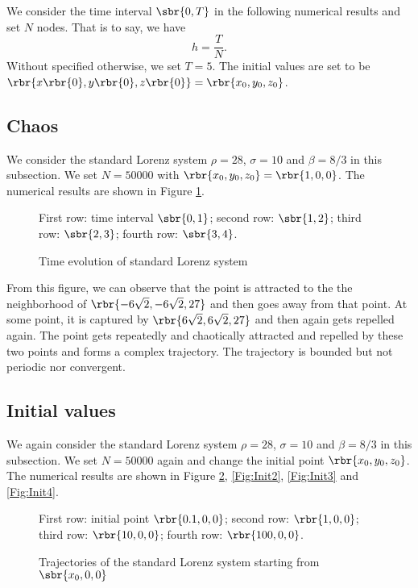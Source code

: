 \documentclass[english, nochinese]{pnote}
\begin{document}
We consider the time interval $ \sbr{ 0, T } $ in the following numerical results and set $N$ nodes. That is to say, we have
\begin{equation}
h = \frac{T}{N}.
\end{equation}
Without specified otherwise, we set $ T = 5 $. The initial values are set to be $ \rbr{ x \rbr{0}, y \rbr{0}, z \rbr{0} } = \rbr{ x_0, y_0, z_0 } $.

\subsection{Chaos}

We consider the standard Lorenz system $ \rho = 28 $, $ \sigma = 10 $ and $ \beta = 8 / 3 $ in this subsection. We set $ N = 50000 $ with $ \rbr{ x_0, y_0, z_0 } = \rbr{ 1, 0, 0 } $. The numerical results are shown in Figure \ref{Fig:Chaos}.

\begin{figure}[htbp]
{
\centering
\scalebox{0.5}{}
\scalebox{0.5}{}
\scalebox{0.5}{}
\scalebox{0.5}{}
\caption{Time evolution of standard Lorenz system}
\label{Fig:Chaos}
}
{
\footnotesize First row: time interval $ \sbr{ 0, 1 } $; second row: $ \sbr{ 1, 2 } $; third row: $ \sbr{ 2, 3 } $; fourth row: $ \sbr{ 3, 4 } $.
}
\end{figure}

From this figure, we can observe that the point is attracted to the the neighborhood of $ \rbr{ -6 \sqrt{2}, -6 \sqrt{2}, 27 } $ and then goes away from that point. At some point, it is captured by $ \rbr{ 6 \sqrt{2}, 6 \sqrt{2}, 27 } $ and then again gets repelled again. The point gets repeatedly and chaotically attracted and repelled by these two points and forms a complex trajectory. The trajectory is bounded but not periodic nor convergent.

\subsection{Initial values}

We again consider the standard Lorenz system $ \rho = 28 $, $ \sigma = 10 $ and $ \beta = 8 / 3 $ in this subsection. We set $ N = 50000 $ again and change the initial point $ \rbr{ x_0, y_0, z_0 } $. The numerical results are shown in Figure \ref{Fig:Init1}, \ref{Fig:Init2}, \ref{Fig:Init3} and \ref{Fig:Init4}.

\begin{figure}[htbp]
{
\centering
\scalebox{0.5}{}
\scalebox{0.5}{}
\scalebox{0.5}{}
\scalebox{0.5}{}
\caption{Trajectories of the standard Lorenz system starting from $ \sbr{ x_0, 0, 0 }$}
\label{Fig:Init1}
}
{
\footnotesize First row: initial point $ \rbr{ 0.1, 0, 0 } $; second row: $ \rbr{ 1, 0, 0 } $; third row: $ \rbr{ 10, 0, 0 } $; fourth row: $ \rbr{ 100, 0, 0 } $.
}
\end{figure}
\end{document}
